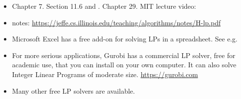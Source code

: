 \begin{itemize}
\item \DPV Chapter 7.  \KT Section 11.6 and \KWSlides.  \CLRS Chapter 29. MIT lecture video:

  {\small
{}}
  
\item \JE notes: \url{https://jeffe.cs.illinois.edu/teaching/algorithms/notes/H-lp.pdf}

\item Microsoft Excel has a free add-on for solving LPs in a spreadsheet.  See e.g.
  
  {\small
    }

\item For more serious applications, Gurobi has a commercial LP solver, free for academic use, that you can install on your own computer.  It can also solve Integer Linear Programs of moderate size.  \url{https://gurobi.com}

\item Many other free LP solvers are available.

\end{itemize}

